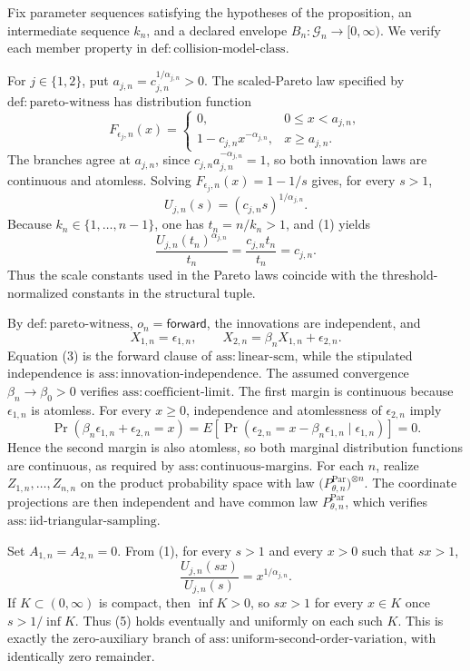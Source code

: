 Fix parameter sequences satisfying the hypotheses of the proposition, an intermediate sequence \(k_n\), and a declared envelope \(B_n:\mathcal G_n\to[0,\infty)\).  We verify each member property in \(\mathrm{def:collision\text{-}model\text{-}class}\).

For \(j\in\{1,2\}\), put \(a_{j,n}=c_{j,n}^{1/\alpha_{j,n}}>0\).  The scaled-Pareto law specified by \(\mathrm{def:pareto\text{-}witness}\) has distribution function
\[
 F_{\epsilon_j,n}(x)=
 \begin{cases}
 0,&0\leq x<a_{j,n},\\
 1-c_{j,n}x^{-\alpha_{j,n}},&x\geq a_{j,n}.
 \end{cases}
\]
The branches agree at \(a_{j,n}\), since \(c_{j,n}a_{j,n}^{-\alpha_{j,n}}=1\), so both innovation laws are continuous and atomless.  Solving \(F_{\epsilon_j,n}(x)=1-1/s\) gives, for every \(s>1\),
\[
 U_{j,n}(s)=(c_{j,n}s)^{1/\alpha_{j,n}}. \tag{1}
\]
Because \(k_n\in\{1,\ldots,n-1\}\), one has \(t_n=n/k_n>1\), and (1) yields
\[
 \frac{U_{j,n}(t_n)^{\alpha_{j,n}}}{t_n}
 =\frac{c_{j,n}t_n}{t_n}=c_{j,n}. \tag{2}
\]
Thus the scale constants used in the Pareto laws coincide with the threshold-normalized constants in the structural tuple.

By \(\mathrm{def:pareto\text{-}witness}\), \(o_n=\mathsf{forward}\), the innovations are independent, and
\[
 X_{1,n}=\epsilon_{1,n},\qquad
 X_{2,n}=\beta_nX_{1,n}+\epsilon_{2,n}. \tag{3}
\]
Equation (3) is the forward clause of \(\mathrm{ass:linear\text{-}scm}\), while the stipulated independence is \(\mathrm{ass:innovation\text{-}independence}\).  The assumed convergence \(\beta_n\to\beta_0>0\) verifies \(\mathrm{ass:coefficient\text{-}limit}\).  The first margin is continuous because \(\epsilon_{1,n}\) is atomless.  For every \(x\geq0\), independence and atomlessness of \(\epsilon_{2,n}\) imply
\[
 \Pr\!\left(\beta_n\epsilon_{1,n}+\epsilon_{2,n}=x\right)
 =E\!\left[
   \Pr\!\left(\epsilon_{2,n}=x-\beta_n\epsilon_{1,n}
      \mid\epsilon_{1,n}\right)
 \right]=0. \tag{4}
\]
Hence the second margin is also atomless, so both marginal distribution functions are continuous, as required by \(\mathrm{ass:continuous\text{-}margins}\).  For each \(n\), realize \(Z_{1,n},\ldots,Z_{n,n}\) on the product probability space with law \(\bigl(P_{\theta,n}^{\mathrm{Par}}\bigr)^{\otimes n}\).  The coordinate projections are then independent and have common law \(P_{\theta,n}^{\mathrm{Par}}\), which verifies \(\mathrm{ass:iid\text{-}triangular\text{-}sampling}\).

Set \(A_{1,n}=A_{2,n}=0\).  From (1), for every \(s>1\) and every \(x>0\) such that \(sx>1\),
\[
 \frac{U_{j,n}(sx)}{U_{j,n}(s)}=x^{1/\alpha_{j,n}}. \tag{5}
\]
If \(K\subset(0,\infty)\) is compact, then \(\inf K>0\), so \(sx>1\) for every \(x\in K\) once \(s>1/\inf K\).  Thus (5) holds eventually and uniformly on each such \(K\).  This is exactly the zero-auxiliary branch of \(\mathrm{ass:uniform\text{-}second\text{-}order\text{-}variation}\), with identically zero remainder.

